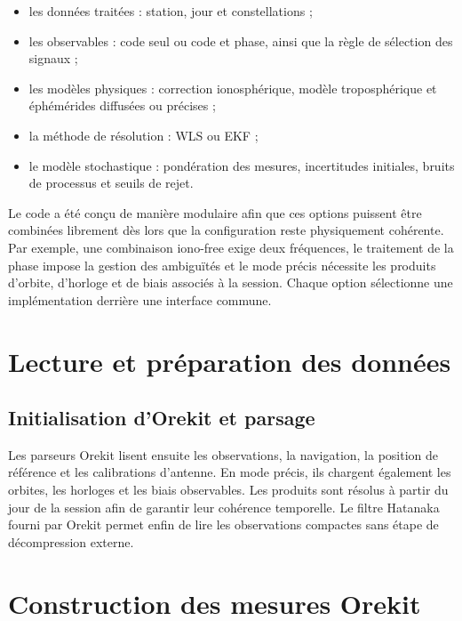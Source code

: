 \begin{itemize}
    \item les données traitées : station, jour et constellations ;
    \item les observables : code seul ou code et phase, ainsi que la règle de
    sélection des signaux ;
    \item les modèles physiques : correction ionosphérique, modèle
    troposphérique et éphémérides diffusées ou précises ;
    \item la méthode de résolution : WLS ou EKF ;
    \item le modèle stochastique : pondération des mesures, incertitudes
    initiales, bruits de processus et seuils de rejet.
\end{itemize}

Le code a été conçu de manière modulaire afin que ces options puissent être
combinées librement dès lors que la configuration reste physiquement
cohérente. Par exemple, une combinaison iono-free exige deux
fréquences, le traitement de la phase impose la gestion des ambiguïtés et le
mode précis nécessite les produits d'orbite, d'horloge et de biais associés à
la session. Chaque option sélectionne une implémentation derrière une
interface commune.


\section{Lecture et préparation des données}
\label{sec:data_implementation}

\subsection{Initialisation d'Orekit et parsage}

Les parseurs Orekit lisent ensuite les observations, la navigation, la
position de référence et les calibrations d'antenne. En mode précis, ils
chargent également les orbites, les horloges et les biais observables. Les
produits sont résolus à partir du jour de la session afin de garantir leur
cohérence temporelle. Le filtre Hatanaka fourni par Orekit permet enfin de lire les
observations compactes sans étape de décompression externe.



\section{Construction des mesures Orekit}
\label{sec:measurement_implementation}

